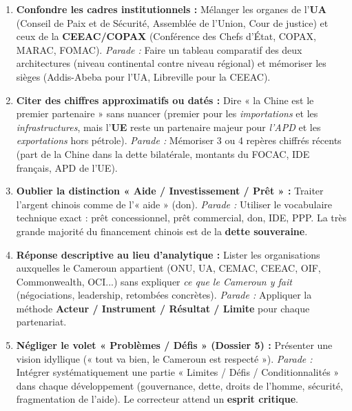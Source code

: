 \documentclass[11pt]{article}
\newcommand{\cle}[1]{{\popxbold\color{popdark}#1}}
\begin{document}
\begin{attention}
    \begin{enumerate}
        \item \textbf{Confondre les cadres institutionnels :} Mélanger les organes de l'\textbf{UA} (Conseil de Paix et de Sécurité, Assemblée de l'Union, Cour de justice) et ceux de la \textbf{CEEAC/COPAX} (Conférence des Chefs d'État, COPAX, MARAC, FOMAC). \emph{Parade :} Faire un tableau comparatif des deux architectures (niveau continental contre niveau régional) et mémoriser les sièges (Addis-Abeba pour l'UA, Libreville pour la CEEAC).
        \item \textbf{Citer des chiffres approximatifs ou datés :} Dire « la Chine est le premier partenaire » sans nuancer (premier pour les \emph{importations} et les \emph{infrastructures}, mais l'\textbf{UE} reste un partenaire majeur pour \emph{l'APD} et les \emph{exportations} hors pétrole). \emph{Parade :} Mémoriser 3 ou 4 repères chiffrés récents (part de la Chine dans la dette bilatérale, montants du FOCAC, IDE français, APD de l'UE).
        \item \textbf{Oublier la distinction « Aide / Investissement / Prêt » :} Traiter l'argent chinois comme de l'« aide » (don). \emph{Parade :} Utiliser le vocabulaire technique exact : \cle{prêt concessionnel}, \cle{prêt commercial}, \cle{don}, \cle{IDE}, \cle{PPP}. La très grande majorité du financement chinois est de la \textbf{dette souveraine}.
        \item \textbf{Réponse descriptive au lieu d'analytique :} Lister les organisations auxquelles le Cameroun appartient (ONU, UA, CEMAC, CEEAC, OIF, Commonwealth, OCI...) sans expliquer \emph{ce que le Cameroun y fait} (négociations, leadership, retombées concrètes). \emph{Parade :} Appliquer la méthode \textbf{Acteur / Instrument / Résultat / Limite} pour chaque partenariat.
        \item \textbf{Négliger le volet « Problèmes / Défis » (Dossier 5) :} Présenter une vision idyllique (« tout va bien, le Cameroun est respecté »). \emph{Parade :} Intégrer systématiquement une partie « Limites / Défis / Conditionnalités » dans chaque développement (gouvernance, dette, droits de l'homme, sécurité, fragmentation de l'aide). Le correcteur attend un \textbf{esprit critique}.
    \end{enumerate}
\end{attention}

\newpage
\end{document}
